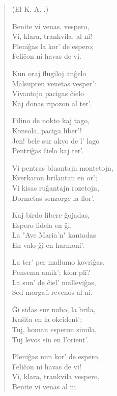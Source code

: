 \begin{verse}
\begin{center}
\footnotesize (El K. A. .)
\end{center}
                     Benite vi venas, vespero,\\
                     Vi, klara, trankvila, al ni!\\
                     Pleni\^gas la kor' de espero;\\
                     Feli\^con ni havas de vi.

                     Kun oraj flugiloj an\^gelo\\
                     Malsupren venetas vesper':\\
                     Vivantojn pacigas \^cielo\\
                     Kaj donas ripozon al ter'.

                     Filino de nokto kaj tago,\\
                     Konsola, paciga liber'!\\
                     Jen! bele sur akvo de l' lago\\
                     Pentri\^gas \^cielo kaj ter'.

                     Vi pentras bluantajn montetojn,\\
                     Kverkaron brilantan en or';\\
                     Vi kisas ru\^gantajn rozetojn,\\
                     Dormetas senzorge la flor'.

                     Kaj birdo libere \^gojadas,\\
                     Espero fidela en \^gi,\\
                     La "Ave Maria'n" kantadas\\
                     En valo \^gi en harmoni'.

                     La ter' per mallumo kovri\^gas,\\
                     Pensema amik'; kion pli?\\
                     La sun' de \^ciel' mallevi\^gas,\\
                     Sed morga\u u revenos al ni.

                     \^Gi sidas sur nubo, la brila,\\
                     Ka\^sita en la okcident';\\
                     Tuj, homan esperon simila,\\
                     Tuj levos sin en l'orient'.

                     Pleni\^gas nun kor' de espero,\\
                     Feli\^con ni havas de vi!\\
                     Vi, klara, trankvila vespero,\\
                     Benite vi venas al ni.

\end{verse}

\smallrule{}
